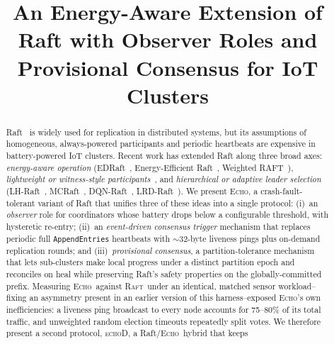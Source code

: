 \documentclass[conference]{IEEEtran}
\newcommand{\echoproto}{\textsc{Echo}\xspace}
\newcommand{\raftproto}{\textsc{Raft}\xspace}
\newcommand{\echodproto}{\textsc{echoD}\xspace}
\begin{document}
\title{An Energy-Aware Extension of Raft with Observer Roles
  and Provisional Consensus for IoT Clusters}

\author{
}

\maketitle

\begin{abstract}
Raft~\cite{ongaro2014raft} is widely used for replication in distributed
systems, but its assumptions of homogeneous, always-powered participants
and periodic heartbeats are expensive in battery-powered IoT clusters.
Recent work has extended Raft along three broad axes: \emph{energy-aware
operation} (EDRaft~\cite{barros2023edraft}, Energy-Efficient
Raft~\cite{nakagawa2017energy}, Weighted RAFT~\cite{xu2021weighted}),
\emph{lightweight or witness-style participants}~\cite{paris2015reducing,
blanco2023pycloudiot}, and \emph{hierarchical or adaptive leader selection}
(LH-Raft~\cite{guo2022lhraft}, MCRaft~\cite{xu2022mcraft},
DQN-Raft~\cite{liu2022dqnraft}, LRD-Raft~\cite{yang2025lrdraft}). We
present \echoproto, a crash-fault-tolerant variant of Raft that unifies
three of these ideas into a single protocol: (i)~an \emph{observer} role
for coordinators whose battery drops below a configurable threshold,
with hysteretic re-entry; (ii)~an \emph{event-driven consensus trigger}
mechanism that replaces periodic full \texttt{AppendEntries} heartbeats
with $\sim$32-byte liveness pings plus on-demand replication rounds;
and (iii)~\emph{provisional consensus}, a partition-tolerance mechanism
that lets sub-clusters make local progress under a distinct partition
epoch and reconciles on heal while preserving Raft's safety properties
on the globally-committed prefix. Measuring \echoproto\ against
\raftproto\ under an identical, matched sensor workload--fixing an
asymmetry present in an earlier version of this harness--exposed
\echoproto's own inefficiencies: a liveness ping broadcast to every
node accounts for 75--80\% of its total traffic, and unweighted random
election timeouts repeatedly split votes. We therefore present a second
protocol, \echodproto, a Raft/\echoproto\ hybrid that keeps

\end{abstract}
\end{document}
